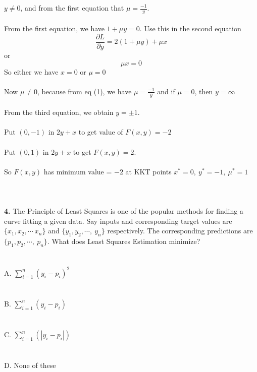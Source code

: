 \documentclass[prl,twocolumn,showpacs,preprintnumbers,superscriptaddress]{revtex4}
\theoremstyle{plain}
\theoremstyle{definition}
\begin{document}
\begin{widetext}
$y \ne 0$, and from the first equation that $\mu = \frac {-1}{y}$.\\
\\
From the first equation, we have $1 + \mu y = 0$. Use this in the
second equation
\begin{equation}
    \frac{\partial L}{\partial y} = 2(1 + \mu y) + \mu x 
\end{equation}
or
\begin{equation}
    \mu x = 0
\end{equation}
So either we have $x = 0$ or $\mu = 0$
\\
\\
Now $\mu \ne 0$, because from eq (1), we have $\mu = \frac {-1}{y}$ and if $\mu = 0$, then $y = \infty$
\\
\\
From the third
equation, we obtain $y = \pm 1$.
\\
\\
Put $(0, -1)$ in $2y + x$ to get value of $F(x, y) = -2$
\\
\\
Put $(0, 1)$ in $2y + x$ to get $F(x, y) = 2$.
\\
\\
So $F(x, y)$ has minimum value = $-2$ at KKT points $x^* = 0,\  y^* = -1,\  \mu^* = 1$
\\
\\
\\
\\
\textbf{4.} The Principle of Least Squares is one of the popular methods for finding a curve fitting a given data. Say inputs and corresponding target values are $\{x_{1},x_{2}, \cdots \  x_{n}\}$ and  $\{y_{1}, y_{2}, \cdots, \  y_{n}\}$ respectively. The corresponding predictions are $\{p_{1}, p_{2}, \cdots, \  p_{n}\}$. What does Least Squares Estimation minimize?  
\\
\\
\\
A. $\sum_{i=1}^n(y_{i} - p_{i})^2$
\\
\\
\\
B. $\sum_{i=1}^n(y_{i} - p_{i})$
\\
\\
\\
C. $\sum_{i=1}^n(|y_{i} - p_{i}|)$
\\
\\
\\
D. None of these
\\

\end{widetext}
\end{document}
